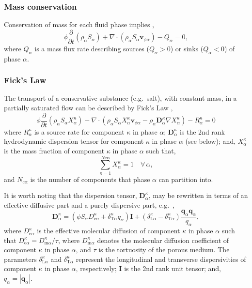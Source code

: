 \subsubsection{Mass conservation}

Conservation of mass for each fluid phase implies \cite{bear_1972},
\begin{equation}\label{e:mass}
\phi \frac{\partial}{\partial t}(\rho_\alpha S_\alpha) + \nabla\cdot(\rho_\alpha S_\alpha  \mathbf{v}_{\phi \alpha}) - Q_\alpha = 0,
\end{equation}
where $Q_\alpha$ is a mass flux rate describing sources ($Q_\alpha >0$) or sinks ($Q_\alpha <0$) of phase $\alpha$.

\subsubsection{Fick's Law}

The transport of a conservative substance (e.g.\ salt), with constant mass, in a partially saturated flow can be described by Fick's Law \cite{helmig_1997},
\begin{equation}\label{e:transport}
\phi \frac{\partial}{\partial t}(\rho_\alpha S_\alpha X_\alpha^\kappa) + \nabla \cdot \left( \rho_\alpha S_\alpha X_\alpha^\kappa \mathbf{v}_{\phi\alpha} - \rho_\alpha \mathbf{D}_\alpha^\kappa \nabla X_\alpha^\kappa \right) - R_\alpha^\kappa = 0
\end{equation}
where $R_\alpha^\kappa$ is a source rate for component $\kappa$ in phase $\alpha$; $\mathbf{D}_\alpha^\kappa$ is the 2nd rank hydrodynamic dispersion tensor for component $\kappa$ in phase $\alpha$ (see below); and, $X_\alpha^\kappa$ is the mass fraction of component $\kappa$ in phase $\alpha$ such that,
\begin{equation}
\sum_{\kappa = 1}^{N\mathrm{c\alpha}} X_\alpha^\kappa = 1 \quad \forall\, \alpha,
\end{equation}
and $N_\mathrm{c\alpha}$ is the number of components that phase $\alpha$ can partition into.

It is worth noting that the dispersion tensor, $\mathbf{D}_\alpha^{\kappa}$, may be rewritten in terms of an effective diffusive part and a purely dispersive part, e.g.\ \cite{scheidegger_1961},
\begin{equation}
\mathbf{D}_\alpha^\kappa = (\phi S_\alpha D^{\kappa}_{\mathrm{e} \alpha} + \delta^{\kappa}_{\mathrm{T} \alpha} q_\alpha ) \mathbf{I} + (\delta^{\kappa}_{\mathrm{L} \alpha} - \delta^{\kappa}_{\mathrm{T} \alpha}) \frac{\mathbf{q}_\alpha \mathbf{q}_\alpha}{q_\alpha},
\end{equation}
where $D^{\kappa}_{\mathrm{e} \alpha}$ is the effective molecular diffusion of component $\kappa$ in phase $\alpha$ such that $D^{\kappa}_{\mathrm{e} \alpha} = D^{\kappa}_{\mathrm{m} \alpha} / \tau$, where $D^{\kappa}_{\mathrm{m} \alpha}$ denotes the molecular diffusion coefficient of component $\kappa$ in phase $\alpha$, and $\tau$ is the tortuosity of the porous medium.  The parameters $\delta^{\kappa}_{\mathrm{L} \alpha}$ and $\delta^{\kappa}_{\mathrm{T} \alpha}$ represent the longitudinal and transverse dispersivities of component $\kappa$ in phase $\alpha$, respectively; $\mathbf{I}$ is the 2nd rank unit tensor; and, $q_\alpha = | \mathbf{q}_\alpha |$.

